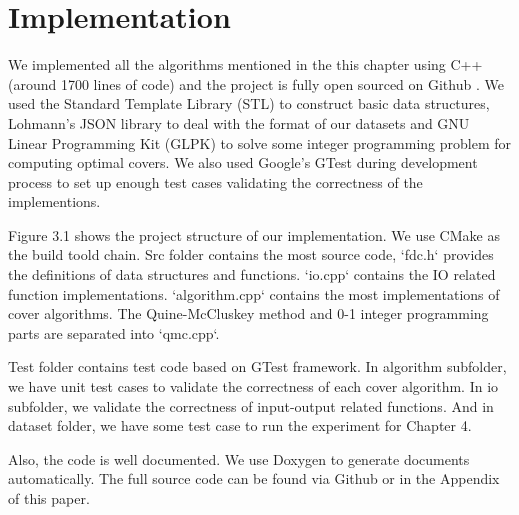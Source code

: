 \documentclass[11pt]{book}
\begin{document}
\section{Implementation}

We implemented all the algorithms mentioned in the this chapter using C++ (around 1700 lines of code) and the project is fully open sourced on Github \cite{githubfdc}. We used the Standard Template Library (STL) \cite{plauger2000c++} to construct basic data structures, Lohmann's JSON library \cite{nlohmann_json} to deal with the format of our datasets and GNU Linear Programming Kit (GLPK) \cite{makhorin2008glpk} to solve some integer programming problem for computing optimal covers. We also used Google's GTest \cite{barca2016gtest} during development process to set up enough test cases validating the correctness of the implementions.

Figure 3.1 shows the project structure of our implementation. We use CMake \cite{martin2010mastering} as the build toold chain. Src folder contains the most source code, `fdc.h` provides the definitions of data structures and functions. `io.cpp` contains the IO related function implementations. `algorithm.cpp` contains the most implementations of cover algorithms. The Quine-McCluskey method and 0-1 integer programming parts are separated into `qmc.cpp`.

Test folder contains test code based on GTest \cite{barca2016gtest} framework. In algorithm subfolder, we have unit test cases to validate the correctness of each cover algorithm. In io subfolder, we validate the correctness of input-output related functions. And in dataset folder, we have some test case to run the experiment for Chapter 4.

Also, the code is well documented. We use Doxygen \cite{laramee2011bob} to generate documents automatically. The full source code can be found via Github \cite{githubfdc} or in the Appendix of this paper.
\end{document}
